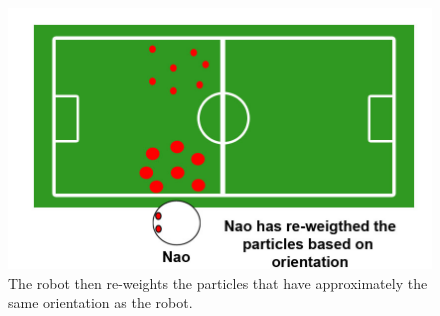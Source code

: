 \begin{figure}[h!] 
\centering
\includegraphics[scale=0.2]{../Drawings/localisation/localisationAlgorithmReweight.jpg}
\caption{The robot then re-weights the particles that have approximately the same orientation as the robot.}
\label{fig:reweight}
\end{figure}





%





